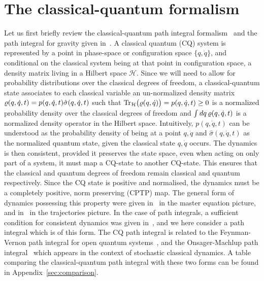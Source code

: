 \documentclass[aps,preprintnumbers,superscriptaddress,longbibliography]{revtex4-1}
\def\z{{q,\dot{q}}}
\begin{document}
\section{The classical-quantum formalism}
\label{sec: CQ}

Let us first briefly review the classical-quantum path integral formalism~\cite{oppenheim2023path} and the path integral for gravity given in~\cite{oppenheim2023covariant}. A classical quantum (CQ) system is represented by a point in phase-space or configuration space $\{q,\dot{q}\}$, and conditional on the classical system being at that point in configuration space, a density matrix living in a Hilbert space  $\mathcal{H}$.  Since we will need to allow for probability distributions over the classical degrees of freedom, a classical-quantum state associates to each classical variable an un-normalized density matrix $\cqstate(q,\dot{q},t) =p(q,\dot{q},t) \hat{\sigma}(\z,t)$ such that $\text{Tr}_{\mathcal{H}}\big(\cqstate(\z)\big) = p(\z,t) \geq 0$ is a normalized probability density over the classical degrees of freedom and $\int dq\, \cqstate(\z,t) $ is a normalized density operator in the Hilbert space. Intuitively, $p(\z,t)$ can be understood as the probability density of being at a point $q,\dot{q}$ and  $\hat{\sigma}(\z,t)$ as the normalized quantum state, given the classical state $\z$ occurs. The dynamics is then consistent, provided it preserves the state space, even when acting on only part of a system, it must map a CQ-state to another CQ-state. This ensures that the classical and quantum degrees of freedom remain classical and quantum respectively. Since the CQ state is positive and normalised, the dynamics must be a completely positive, norm preserving (CPTP) map. The general form of dynamics possessing this property were given in~\cite{oppenheim2018post,UCLPawula} in the master equation picture, and in~\cite{layton2022semi} in the trajectories picture. In the case of path integrals, a sufficient condition for consistent dynamics was given in~\cite{oppenheim2023covariant}, and we here consider a path integral which is of this form. The CQ path integral is related to the Feynman-Vernon path integral for open quantum systems~\cite{FeynmanVernon1963}, and the Onsager-Machlup path integral~\cite{Onsager1953Fluctuations} which appears in the context of stochastic classical dynamics. A table comparing the classical-quantum path integral with these two forms can be found in Appendix~\ref{sec:comparison}.
\end{document}
